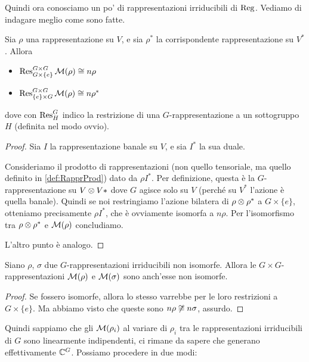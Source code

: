 	Quindi ora conosciamo un po' di rappresentazioni irriducibili di $\operatorname{Reg}$. Vediamo di indagare meglio come sono fatte.
	
	\begin{myprop}
		Sia $\rho$ una rappresentazione su $V$, e sia $\rho^*$ la corrispondente rappresentazione su $V^*$. Allora
		\begin{itemize}
		 \item $\operatorname{Res}_{G\times \{e\}}^{G\times G}\mathcal M(\rho) \cong n\rho$
		 \item $\operatorname{Res}_{\{e\}\times G}^{G\times G}\mathcal M(\rho) \cong n\rho^*$
		\end{itemize}
		dove con $\operatorname{Res}_H^G$ indico la restrizione di una $G$-rappresentazione a un sottogruppo $H$ (definita nel modo ovvio).
	 
	\end{myprop}

	\begin{proof}
		Sia $I$ la rappresentazione banale su $V$, e sia $I^*$ la sua duale. 

		Consideriamo il prodotto di rappresentazioni (non quello tensoriale, ma quello definito in \ref{def:RapprProd}) dato da $\rho I^*$. Per definizione, questa è la $G$-rappresentazione su $V\otimes V*$ dove $G$ agisce solo su $V$ (perché su $V^*$ l'azione è quella banale). Quindi se noi restringiamo l'azione bilatera di $\rho \otimes \rho^*$ a $G \times \{e\}$, otteniamo precisamente $\rho I^*$, che è ovviamente isomorfa a $n\rho$. Per l'isomorfismo tra $\rho \otimes \rho^*$ e $\mathcal M(\rho)$ concludiamo.
		
		L'altro punto è analogo.
	\end{proof}		
	
	\begin{myprop}
	 Siano $\rho$, $\sigma$ due $G$-rappresentazioni irriducibili non isomorfe. Allora le $G\times G$-rappresentazioni $\mathcal M(\rho)$ e $\mathcal M(\sigma)$ sono anch'esse non isomorfe.
	\end{myprop}
	
	\begin{proof}
	 Se fossero isomorfe, allora lo stesso varrebbe per le loro restrizioni a $G \times \{e\}$. Ma abbiamo visto che queste sono $n\rho \not\cong n\sigma$, assurdo.
	\end{proof}
	
	Quindi sappiamo che gli $\mathcal M(\rho_i)$ al variare di $\rho_i$ tra le rappresentazioni irriducibili di $G$ sono linearmente indipendenti, ci rimane da sapere che generano effettivamente $\mathbb C^{G}$. Possiamo procedere in due modi:
	

